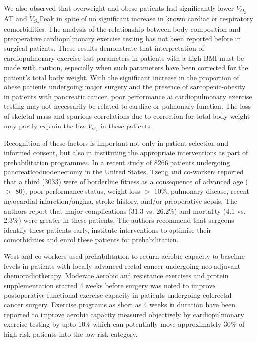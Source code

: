We also observed that overweight and obese patients had significantly lower $\dot{V}_{O_2}$AT and $\dot{V}_{O_2}$Peak in spite of no significant increase in known cardiac or respiratory comorbidities. The analysis of the relationship between body composition and preoperative cardiopulmonary exercise testing has not been reported before in surgical patients. These results demonstrate that interpretation of cardiopulmonary exercise test parameters in patients with a high BMI must be made with caution, especially when such parameters have been corrected for the patient's total body weight. With the significant increase in the proportion of obese patients undergoing major surgery and the presence of sarcopenic-obesity in patients with pancreatic cancer, poor performance at cardiopulmonary exercise testing may not necessarily be related to cardiac or pulmonary function. The loss of skeletal mass and spurious correlations due to correction for total body weight may partly explain the low $\dot{V}_{O_2}$ in these patients. 

Recognition of these factors is important not only in patient selection and informed consent, but also in instituting the appropriate interventions as part of prehabilitation programmes. In a recent study of 8266 patients undergoing pancreaticoduodenectomy in the United States, Tzeng and co-workers reported that a third (3033) were of borderline fitness as a consequence of advanced age ($>$ 80), poor performance status, weight loss $>$ 10\%, pulmonary disease, recent myocardial infarction/angina, stroke history, and/or preoperative sepsis. The authors report that major complications (31.3 vs. 26.2\%) and mortality (4.1 vs. 2.3\%) were greater in these patients.\parencite{tzeng_morbidity_2014} 
The authors recommend that surgeons identify these patients early, institute interventions to optimise their comorbidities and enrol these patients for prehabilitation. 

West and co-workers used prehabilitation to return aerobic capacity to baseline levels in patients with locally advanced rectal cancer undergoing neo-adjuvant chemoradiotherapy.\parencite{west_effect_2015} 
Moderate aerobic and resistance exercises and protein supplementation started 4 weeks before surgery was noted to improve postoperative functional exercise capacity in patients undergoing colorectal cancer surgery.\parencite{gillis_prehabilitation_2014}
Exercise programs as short as 4 weeks in duration have been reported to improve aerobic capacity measured objectively by cardiopulmonary exercise testing by upto 10\% which can potentially move approximately 30\% of high risk patients into the low risk category.\parencite{dunne_pmo-029_2012}


